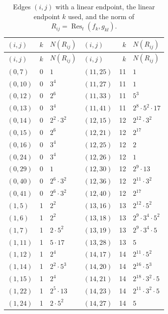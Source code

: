 \documentclass[11pt]{article}
\begin{document}
\begingroup\small
\setlength{\LTcapwidth}{\textwidth}
\begin{longtable}{@{}lrl@{\qquad}lrl@{}}
\caption{Edges $(i,j)$ with a linear endpoint, the linear endpoint $k$ used, and the norm of $R_{ij}=\operatorname{Res}_t(f_k,g_{kl})$.}\label{tab:sep}\\
\hline $(i,j)$ & $k$ & $N(R_{ij})$ & $(i,j)$ & $k$ & $N(R_{ij})$\\\hline\endfirsthead\hline $(i,j)$ & $k$ & $N(R_{ij})$ & $(i,j)$ & $k$ & $N(R_{ij})$\\\hline\endhead\hline\endfoot
$(0,7)$ & 0 & $1$ & $(11,25)$ & 11 & $1$\\
$(0,10)$ & 0 & $3^{4}$ & $(11,27)$ & 11 & $1$\\
$(0,12)$ & 0 & $2^{6}$ & $(11,33)$ & 11 & $5^{3}$\\
$(0,13)$ & 0 & $3^{4}$ & $(11,41)$ & 11 & $2^{8}\cdot 5^{2}\cdot 17$\\
$(0,14)$ & 0 & $2^{2}\cdot 3^{2}$ & $(12,15)$ & 12 & $2^{12}\cdot 3^{2}$\\
$(0,15)$ & 0 & $2^{6}$ & $(12,21)$ & 12 & $2^{17}$\\
$(0,16)$ & 0 & $3^{4}$ & $(12,25)$ & 12 & $2$\\
$(0,24)$ & 0 & $3^{4}$ & $(12,26)$ & 12 & $1$\\
$(0,29)$ & 0 & $1$ & $(12,30)$ & 12 & $2^{9}\cdot 13$\\
$(0,40)$ & 0 & $2^{6}\cdot 3^{2}$ & $(12,36)$ & 12 & $2^{11}\cdot 3^{2}$\\
$(0,41)$ & 0 & $2^{6}\cdot 3^{2}$ & $(12,40)$ & 12 & $2^{17}$\\
$(1,5)$ & 1 & $2^{2}$ & $(13,16)$ & 13 & $2^{12}\cdot 5^{2}$\\
$(1,6)$ & 1 & $2^{2}$ & $(13,18)$ & 13 & $2^{9}\cdot 3^{4}\cdot 5^{2}$\\
$(1,7)$ & 1 & $2\cdot 5^{2}$ & $(13,19)$ & 13 & $2^{9}\cdot 3^{4}\cdot 5$\\
$(1,11)$ & 1 & $5\cdot 17$ & $(13,28)$ & 13 & $5$\\
$(1,12)$ & 1 & $2^{4}$ & $(14,17)$ & 14 & $2^{11}\cdot 5^{2}$\\
$(1,14)$ & 1 & $2^{2}\cdot 5^{3}$ & $(14,20)$ & 14 & $2^{16}\cdot 5^{3}$\\
$(1,15)$ & 1 & $2^{4}$ & $(14,21)$ & 14 & $2^{18}\cdot 3^{2}\cdot 5$\\
$(1,22)$ & 1 & $2^{5}\cdot 13$ & $(14,23)$ & 14 & $2^{11}\cdot 3^{2}\cdot 5$\\
$(1,24)$ & 1 & $2\cdot 5^{2}$ & $(14,27)$ & 14 & $5$\\

\end{longtable}
\end{document}

